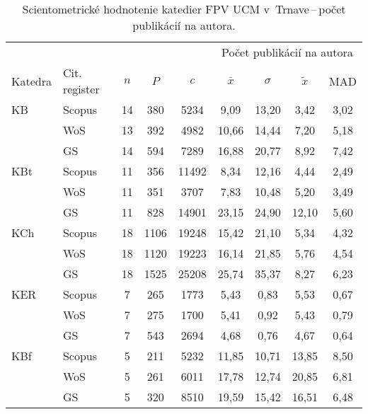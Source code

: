 \begin{table}
  \centering\small
  \caption[Hodnotenie FPV\,--\,počet publikácií na autora]%
  {Scientometrické hodnotenie katedier FPV UCM v~Trnave\,--\,počet publikácií na
    autora.}
  \label{tab:1-staff.results}
  \begin{tabularx}{\textwidth}{lXc@{\hspace{2.5em}}c@{\hspace{2.5em}}c@{\hspace{3.5em}}cccc}
    \toprule\noalign{\vspace{.3ex}}
    & & & & & \multicolumn{4}{c}{Počet publikácií na autora} \\
    \cmidrule{6-9}
    Katedra & Cit. register & $n$ & $P$ & $c$ & $\bar{x}$ & $\sigma$ & $\tilde{x}$ & MAD \\[0.3ex]
    \midrule\noalign{\vspace{.5ex}}
    KB   & Scopus & 14 & 380  & 5234  & 9,09  & 13,20 & 3,42  & 3,02 \\
         & WoS    & 13 & 392  & 4982  & 10,66 & 14,44 & 7,20  & 5,18 \\
         & GS     & 14 & 594  & 7289  & 16,88 & 20,77 & 8,92  & 7,42 \\[3ex]
    KBt  & Scopus & 11 & 356  & 11492 & 8,34  & 12,16 & 4,44  & 2,49 \\
         & WoS    & 11 & 351  & 3707  & 7,83  & 10,48 & 5,20  & 3,49 \\
         & GS     & 11 & 828  & 14901 & 23,15 & 24,90 & 12,10 & 5,60 \\[3ex]
    KCh  & Scopus & 18 & 1106 & 19248 & 15,42 & 21,10 & 5,34  & 4,32 \\
         & WoS    & 18 & 1120 & 19223 & 16,14 & 21,85 & 5,76  & 4,54 \\
         & GS     & 18 & 1525 & 25208 & 25,74 & 35,37 & 8,27  & 6,23 \\[3ex]
    KER  & Scopus & 7  & 265  & 1773  & 5,43  & 0,83  & 5,53  & 0,67 \\
         & WoS    & 7  & 275  & 1700  & 5,41  & 0,92  & 5,43  & 0,79 \\
         & GS     & 7  & 543  & 2694  & 4,68  & 0,76  & 4,67  & 0,64 \\[3ex]
    KBf  & Scopus & 5  & 211  & 5232  & 11,85 & 10,71 & 13,85 & 8,50 \\
         & WoS    & 5  & 261  & 6011  & 17,78 & 12,74 & 20,85 & 6,81 \\
         & GS     & 5  & 320  & 8510  & 19,59 & 15,42 & 16,51 & 6,48 \\[3ex]

\end{tabularx}
\end{table}
